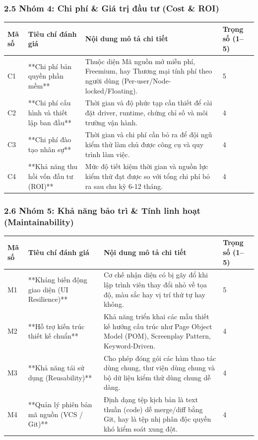 \subsubsection{2.5 Nhóm 4: Chi phí \& Giá trị đầu tư (Cost \& ROI)}

\begin{table}[H]
\centering
\begin{tabular}{|l|l|l|l|}
\hline
\textbf{Mã số} & \textbf{Tiêu chí đánh giá} & \textbf{Nội dung mô tả chi tiết} & \textbf{Trọng số (1–5)} \\ \hline
C1 & **Chi phí bản quyền phần mềm** & Thuộc diện Mã nguồn mở miễn phí, Freemium, hay Thương mại tính phí theo người dùng (Per-user/Node-locked/Floating). & 5 \\ \hline
C2 & **Chi phí cấu hình và thiết lập ban đầu** & Thời gian và độ phức tạp cần thiết để cài đặt driver, runtime, chứng chỉ số và môi trường vận hành. & 4 \\ \hline
C3 & **Chi phí đào tạo nhân sự** & Thời gian và chi phí cần bỏ ra để đội ngũ kiểm thử làm chủ được công cụ và quy trình làm việc. & 4 \\ \hline
C4 & **Khả năng thu hồi vốn đầu tư (ROI)** & Mức độ tiết kiệm thời gian và nguồn lực kiểm thử đạt được so với tổng chi phí bỏ ra sau chu kỳ 6-12 tháng. & 4 \\ \hline
\end{tabular}
\end{table}




\subsubsection{2.6 Nhóm 5: Khả năng bảo trì \& Tính linh hoạt (Maintainability)}

\begin{table}[H]
\centering
\begin{tabular}{|l|l|l|l|}
\hline
\textbf{Mã số} & \textbf{Tiêu chí đánh giá} & \textbf{Nội dung mô tả chi tiết} & \textbf{Trọng số (1–5)} \\ \hline
M1 & **Kháng biến động giao diện (UI Resilience)** & Cơ chế nhận diện có bị gãy đổ khi lập trình viên thay đổi nhỏ về tọa độ, màu sắc hay vị trí thứ tự hay không. & 5 \\ \hline
M2 & **Hỗ trợ kiến trúc thiết kế chuẩn** & Khả năng triển khai các mẫu thiết kế hướng cấu trúc như Page Object Model (POM), Screenplay Pattern, Keyword-Driven. & 4 \\ \hline
M3 & **Khả năng tái sử dụng (Reusability)** & Cho phép đóng gói các hàm thao tác dùng chung, thư viện dùng chung và bộ dữ liệu kiểm thử dùng chung dễ dàng. & 4 \\ \hline
M4 & **Quản lý phiên bản mã nguồn (VCS / Git)** & Định dạng tệp kịch bản là text thuần (code) dễ merge/diff bằng Git, hay là tệp nhị phân độc quyền khó kiểm soát xung đột. & 4 \\ \hline
\end{tabular}
\end{table}




